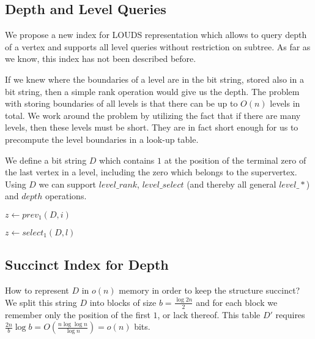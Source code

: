 \subsection{Depth and Level Queries}

We propose a new index for LOUDS representation which allows to query depth of a vertex and supports all level queries without restriction on subtree.
As far as we know, this index has not been described before.

If we knew where the boundaries of a level are in the bit string, stored also in a bit string, then a simple rank operation would give us the depth.
The problem with storing boundaries of all levels is that there can be up to $O(n)$ levels in total.
We work around the problem by utilizing the fact that if there are many levels, then these levels must be short.
They are in fact short enough for us to precompute the level boundaries in a look-up table.

We define a bit string $D$ which contains $1$ at the position of the terminal zero of the last vertex in a level, including the zero which belongs to the supervertex.
Using $D$ we can support $level\_rank$, $level\_select$ (and thereby all general $level\_*$) and $depth$ operations.

\begin{algorithmic}
	\State $z \gets prev_1(D, i)$ 
	\State {}
\EndFunction
\end{algorithmic}

\begin{algorithmic}
	\State $z \gets select_1(D, l)$ 
	\State {}
\EndFunction
\end{algorithmic}

\begin{algorithmic}
	\State {}
\EndFunction
\end{algorithmic}

\subsection{Succinct Index for Depth}

How to represent $D$ in $o(n)$ memory in order to keep the structure succinct?
We split this string $D$ into blocks of size $b = \frac{\log 2n}{2}$ and for each block we remember only the position of the first $1$, or lack thereof.
This table $D'$ requires $\frac{2n}{b} \log b = O(\frac{n \log\log n}{\log n}) = o(n)$ bits.

